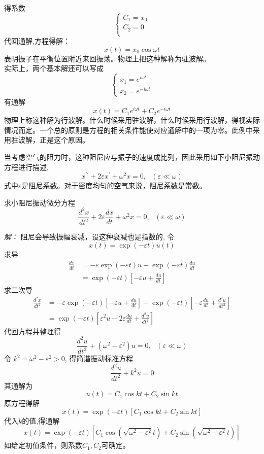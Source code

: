	得系数
	  $$\begin{cases}
		C_1 = x_0 \\
		C_2 = 0 \\
	  \end{cases}$$
	代回通解,方程得解：
	$$x(t)=x_0 \cos \omega t $$ 
	表明振子在平衡位置附近来回振荡。物理上把这种解称为驻波解。\\
	实际上，两个基本解还可以写成
	  $$ \begin{cases}
		x_{1} =e^{i\omega t}  \\
		x_{2} =e^{-i\omega t}
	  \end{cases} $$
	有通解
	  \begin{equation}
	 \boxed{x(t)=C_1 e^{i\omega t} +C_2 e^{-i\omega t} }	
	  \end{equation}
	物理上称这种解为行波解。什么时候采用驻波解，什么时候采用行波解，得视实际情况而定。一个总的原则是方程的相关条件能使对应通解中的一项为零。此例中采用驻波解，正是这个原因。

当考虑空气的阻力时，这种阻尼应与振子的速度成比列，因此采用如下小阻尼振动方程进行描述, 
\begin{equation}
    x^{\prime \prime} +2\varepsilon x^{\prime}  +\omega ^2 x = 0 ,  ~~~ (\varepsilon \ll \omega)   
  \end{equation}
  式中$\varepsilon$是阻尼系数。对于密度均匀的空气来说，阻尼系数是常数。
\begin{example} 
	求小阻尼振动微分方程
	\begin{equation*}
		\frac{d^2 x}{d t^2} +2\varepsilon \frac{d x}{dt} +\omega ^2 x = 0 ,  ~~~ (\varepsilon \ll \omega)   
	  \end{equation*}
\end{example}
\emph{解：} 
		阻尼会导致振幅衰减，设这种衰减也是指数的, 令$$\displaystyle  x(t)= \exp(-\varepsilon t) u(t) $$ 
		求导
		$$
\begin{aligned}
  \frac{d x}{d t } &= -\varepsilon  \exp(-\varepsilon t) u +  \exp(-\varepsilon t) \frac{d u}{d t } \\
  & =\exp(-\varepsilon t) [-\varepsilon u +\frac{d u}{dt}]
\end{aligned}
$$
求二次导
$$
\begin{aligned}
	\frac{d^2 x}{d t^2 } &= -\varepsilon \exp(-\varepsilon t) [-\varepsilon u +\frac{d u}{dt}] + \exp(-\varepsilon t) [-\varepsilon \frac{d u}{dt} +\frac{d^2u}{dt^2}] \\
	& =\exp(-\varepsilon t) [\varepsilon ^2 u -2\varepsilon \frac{d u}{dt}+ \frac{d^2 u}{dt^2} ]
\end{aligned}
$$
代回方程并整理得
$$ \frac{d^2 u}{d t^2} +(\omega ^2 - \varepsilon ^2) u = 0,  ~~~ (\varepsilon \ll  \omega) $$
令 $k^2 =\omega ^2 - \varepsilon ^2 >0 $, 得简谐振动标准方程
$$\frac{d^2 u}{d t^2} +k ^2 u = 0 $$
其通解为
\begin{equation*}
	u(t)=C_1 \cos k t +C_2 \sin k t 
\end{equation*}
原方程得解
$$  x(t)= \exp(-\varepsilon t) \left[C_1 \cos k t +C_2 \sin k t \right] $$ 
代入$k$的值,得通解
$$ x(t)= \exp(-\varepsilon t) \left[C_1 \cos (\sqrt{\omega ^2 - \varepsilon ^2} t) +C_2 \sin (\sqrt{\omega ^2 - \varepsilon ^2} t) \right] $$ 
如给定初值条件，则系数$C_1, C_2$可确定。

